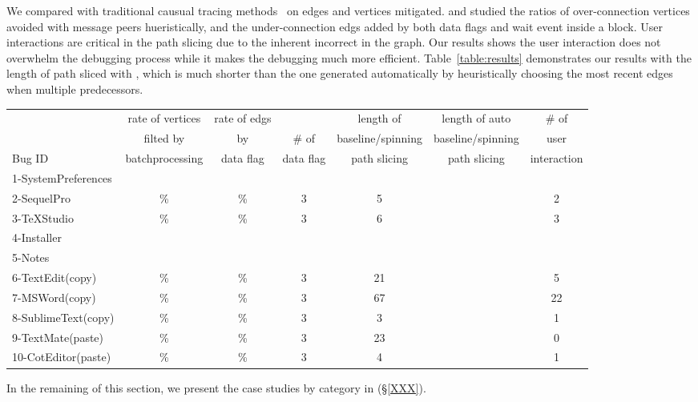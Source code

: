 
We compared \xxx with traditional causual tracing methods~\cite{XXXX} on edges
and vertices \xxx mitigated. and studied the ratios of over-connection vertices
avoided with message peers hueristically, and the under-connection edgs added by
both data flags and wait event inside a block. User interactions are critical in
the path slicing due to the inherent incorrect in the graph. Our results shows
the user interaction does not overwhelm the debugging process while it makes
the debugging much more efficient. Table~\ref{table:results} demonstrates our
results with the length of path sliced with \xxx, which is much shorter than the
one generated automatically by heuristically choosing the most recent edges when
multiple predecessors.


\begin{table*}[ht]
\footnotesize
\centering
  \begin{tabularx}{\textwidth}{l|cccccc}
 	   & rate of vertices   & rate of edgs&           & length of \xxx      & length of auto      & \# of\\
       & filted by          & by          & \# of     & baseline/spinning   & baseline/spinning   &user\\
Bug ID & batchprocessing    & data flag   & data flag & path slicing        & path slicing        &interaction \\
\hline
\hline
 1-SystemPreferences&&&&&&\\
 2-SequelPro & \% & \% & 3 & 5 &  & 2  \\
 3-TeXStudio & \% & \% & 3 & 6 &  & 3 \\
 4-Installer &&&&&& \\
 5-Notes &&&&&& \\
 6-TextEdit(copy)&\% &\% & 3 & 21 & & 5\\
 7-MSWord(copy)&\%&\%& 3 &67& & 22\\
 8-SublimeText(copy)&\%&\%&3 & 3 & & 1\\
 9-TextMate(paste) & \%&\% &3 & 23& & 0\\
 10-CotEditor(paste) & \%& \%& 3 & 4 & & 1\\
\hline
  \end{tabularx}
  \caption{Graph Comparison}
  \label{table:results}
\end{table*}

In the remaining of this section, we present the case studies by category in (\S\ref{XXX}). 

